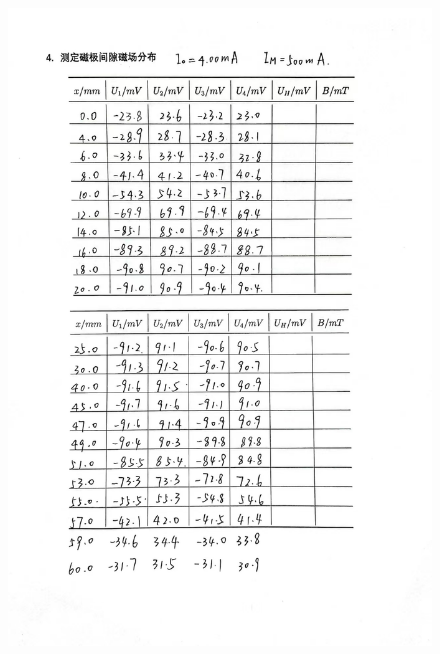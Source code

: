 \documentclass[UTF8]{ctexart}
\begin{document}
\begin{figure}[H]
  \centering
  \includegraphics[scale=0.35]{记录2.jpg}
\end{figure}
\end{document}
